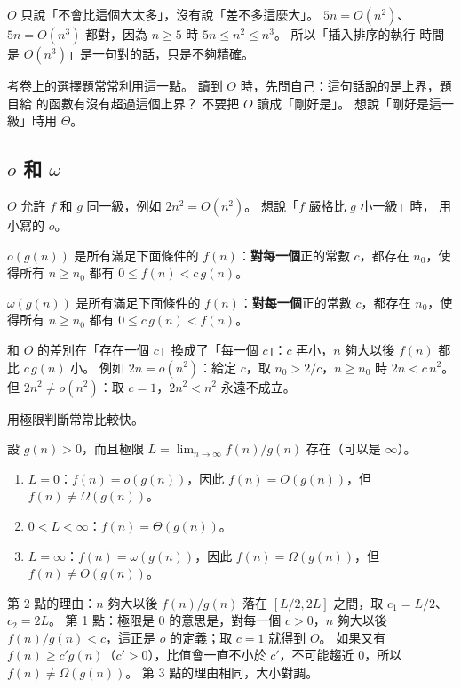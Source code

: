 $O$ 只說「不會比這個大太多」，沒有說「差不多這麼大」。 $5n = O(n^2)$、
$5n = O(n^3)$ 都對，因為 $n \ge 5$ 時 $5n \le n^2 \le n^3$。 所以「插入排序的執行
時間是 $O(n^3)$」是一句對的話，只是不夠精確。

考卷上的選擇題常常利用這一點。 讀到 $O$ 時，先問自己：這句話說的是上界，題目給
的函數有沒有超過這個上界？ 不要把 $O$ 讀成「剛好是」。 想說「剛好是這一級」時用
$\Theta$。

\subsection{$o$ 和 $\omega$}

$O$ 允許 $f$ 和 $g$ 同一級，例如 $2n^2 = O(n^2)$。 想說「$f$ 嚴格比 $g$ 小一級」時，
用小寫的 $o$。

\begin{definition}[$o$ 和 $\omega$]
\label{def:little-o}
$o(g(n))$ 是所有滿足下面條件的 $f(n)$：\textbf{對每一個}正的常數 $c$，都存在
$n_0$，使得所有 $n \ge n_0$ 都有 $0 \le f(n) < c\, g(n)$。

$\omega(g(n))$ 是所有滿足下面條件的 $f(n)$：\textbf{對每一個}正的常數 $c$，都存在
$n_0$，使得所有 $n \ge n_0$ 都有 $0 \le c\, g(n) < f(n)$。
\end{definition}

和 $O$ 的差別在「存在一個 $c$」換成了「每一個 $c$」：$c$ 再小，$n$ 夠大以後
$f(n)$ 都比 $c\,g(n)$ 小。 例如 $2n = o(n^2)$：給定 $c$，取 $n_0 > 2/c$，$n \ge n_0$
時 $2n < c\,n^2$。 但 $2n^2 \ne o(n^2)$：取 $c = 1$，$2n^2 < n^2$ 永遠不成立。

用極限判斷常常比較快。

\begin{theorem}
\label{thm:limit}
設 $g(n) > 0$，而且極限 $L = \lim_{n \to \infty} f(n)/g(n)$ 存在（可以是 $\infty$）。
\begin{enumerate}
\item $L = 0$：$f(n) = o(g(n))$，因此 $f(n) = O(g(n))$，但 $f(n) \ne \Omega(g(n))$。
\item $0 < L < \infty$：$f(n) = \Theta(g(n))$。
\item $L = \infty$：$f(n) = \omega(g(n))$，因此 $f(n) = \Omega(g(n))$，但 $f(n) \ne O(g(n))$。
\end{enumerate}
\end{theorem}

第 2 點的理由：$n$ 夠大以後 $f(n)/g(n)$ 落在 $[L/2, 2L]$ 之間，取 $c_1 = L/2$、
$c_2 = 2L$。 第 1 點：極限是 $0$ 的意思是，對每一個 $c > 0$，$n$ 夠大以後
$f(n)/g(n) < c$，這正是 $o$ 的定義；取 $c = 1$ 就得到 $O$。 如果又有
$f(n) \ge c' g(n)$（$c' > 0$），比值會一直不小於 $c'$，不可能趨近 $0$，所以
$f(n) \ne \Omega(g(n))$。 第 3 點的理由相同，大小對調。

